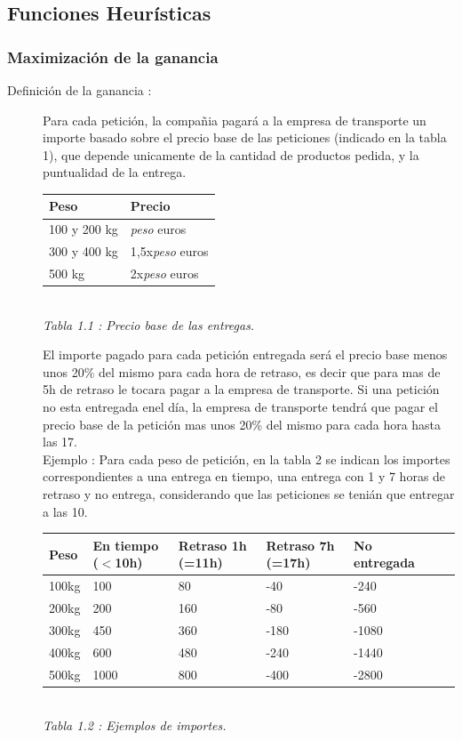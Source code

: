 \documentclass{article}
\begin{document}
\subsection{Funciones Heurísticas}
\subsubsection{Maximización de la ganancia}
\begin{description}
\item[Definición de la ganancia :]
Para cada petición, la compañia pagará a la empresa de transporte un importe
basado sobre el precio base de las peticiones (indicado en la tabla 1), que
depende unicamente de la cantidad de productos pedida, y la puntualidad de la 
entrega.\\
\begin{center}
\begin{tabular}{|l|l|}
\hline
Peso & Precio\\
\hline
100 y 200 kg & {\it peso} euros\\
300 y 400 kg & 1,5x{\it peso} euros\\
500 kg & 2x{\it peso} euros\\
\hline
\end{tabular}\\
{\it Tabla 1.1 : Precio base de las entregas.} \end{center}
El importe pagado para cada petición entregada será el precio base menos unos
20\% del mismo para cada hora de retraso, es decir que para mas de 5h de retraso
le tocara pagar a la empresa de transporte. Si una petición no esta entregada enel día, la empresa de transporte tendrá que pagar el precio base de la petición
mas unos 20\% del mismo para cada hora hasta las 17.\\

Ejemplo : Para cada peso de petición, en la tabla 2 se indican los
importes correspondientes a una entrega en tiempo, una entrega con 1 y 7 horas
de retraso y no entrega, considerando que las peticiones se tenián que entregar
a las 10.
\begin{center}
\begin{tabular}{|l|l|l|l|l|l|l|}
\hline
Peso & En tiempo ($<$10h) & Retraso 1h (=11h) & Retraso 7h (=17h) &
No entregada\\
\hline
100kg & 100 & 80 & -40 & -240\\
200kg & 200 & 160 & -80 & -560\\
300kg & 450 & 360 & -180 & -1080\\
400kg & 600 & 480 & -240 & -1440\\
500kg & 1000 & 800 & -400 & -2800\\
\hline
\end{tabular}\\
{\it Tabla 1.2 : Ejemplos de importes.} \end{center}
\end{description}
\end{document}
